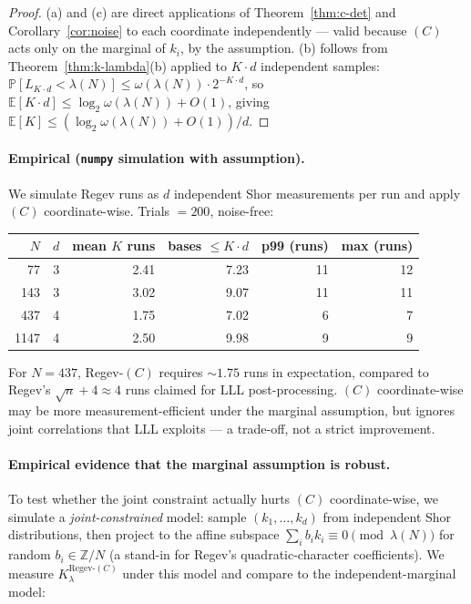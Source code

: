 \documentclass[11pt]{article}
\begin{document}
\begin{proof}
(a) and (c) are direct applications of Theorem~\ref{thm:c-det} and Corollary~\ref{cor:noise} to each coordinate independently --- valid because $(C)$ acts only on the marginal of $k_i$, by the assumption. (b) follows from Theorem~\ref{thm:k-lambda}(b) applied to $K \cdot d$ independent samples: $\mathbb{P}[L_{K \cdot d} < \lambda(N)] \leq \omega(\lambda(N)) \cdot 2^{-K \cdot d}$, so $\mathbb{E}[K \cdot d] \leq \log_2 \omega(\lambda(N)) + O(1)$, giving $\mathbb{E}[K] \leq (\log_2 \omega(\lambda(N)) + O(1)) / d$.
\end{proof}

\paragraph{Empirical (\texttt{numpy} simulation with assumption).} We simulate Regev runs as $d$ independent Shor measurements per run and apply $(C)$ coordinate-wise. Trials $= 200$, noise-free:

\begin{center}
\begin{tabular}{rrrrrr}
\toprule
$N$ & $d$ & mean $K$ runs & bases $\leq K \cdot d$ & p99 (runs) & max (runs) \\
\midrule
  77 & 3 & 2.41 & 7.23 & 11 & 12 \\
 143 & 3 & 3.02 & 9.07 & 11 & 11 \\
 437 & 4 & 1.75 & 7.02 &  6 &  7 \\
1147 & 4 & 2.50 & 9.98 &  9 &  9 \\
\bottomrule
\end{tabular}
\end{center}

For $N = 437$, Regev-$(C)$ requires $\sim 1.75$ runs in expectation, compared to Regev's $\sqrt{n} + 4 \approx 4$ runs claimed for LLL post-processing. $(C)$ coordinate-wise may be more measurement-efficient under the marginal assumption, but ignores joint correlations that LLL exploits --- a trade-off, not a strict improvement.

\paragraph{Empirical evidence that the marginal assumption is robust.} To test whether the joint constraint actually hurts $(C)$ coordinate-wise, we simulate a \emph{joint-constrained} model: sample $(k_1, \ldots, k_d)$ from independent Shor distributions, then project to the affine subspace $\sum_i b_i k_i \equiv 0 \pmod{\lambda(N)}$ for random $b_i \in \mathbb{Z}/N$ (a stand-in for Regev's quadratic-character coefficients). We measure $K_\lambda^{\text{Regev-}(C)}$ under this model and compare to the independent-marginal model:
\end{document}
